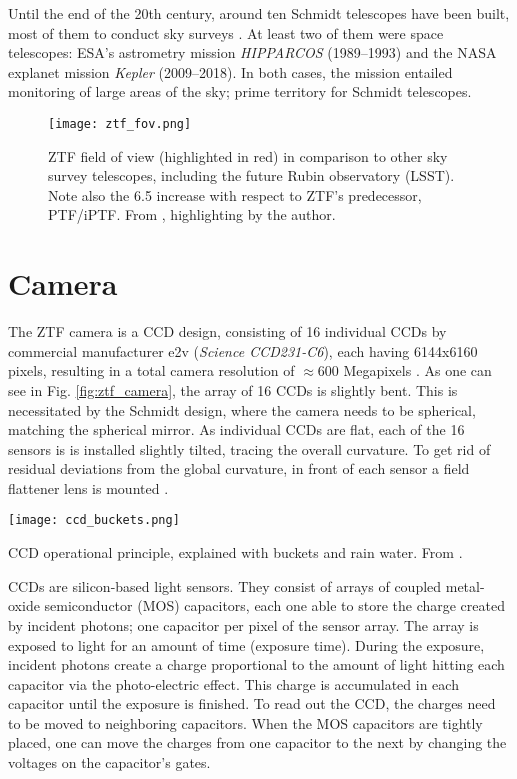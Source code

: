Until the end of the 20th century, around ten Schmidt telescopes have been built, most of them to conduct sky surveys . At least two of them were space telescopes: ESA's astrometry mission \textit{HIPPARCOS}  (1989--1993) and the NASA explanet mission \textit{Kepler}  (2009--2018). In both cases, the mission entailed monitoring of large areas of the sky; prime territory for Schmidt telescopes.

\begin{figure}[]
    \texttt{[image: ztf\_fov.png]}
    \caption[ZTF Field of View]{ZTF field of view (highlighted in red) in comparison to other sky survey telescopes, including the future Rubin observatory (LSST). Note also the 6.5 increase with respect to ZTF's predecessor, PTF/iPTF. From \cite{Laher2018}, highlighting by the author.}
\end{figure}



\section{Camera}
The ZTF camera is a CCD design, consisting of 16 individual CCDs by commercial manufacturer e2v (\textit{Science CCD231-C6}), each having 6144x6160 pixels, resulting in a total camera resolution of $\approx 600$ Megapixels . As one can see in Fig. \ref{fig:ztf_camera}, the array of 16 CCDs is slightly bent. This is necessitated by the Schmidt design, where the camera needs to be spherical, matching the spherical mirror. As individual CCDs are flat, each of the 16 sensors is is installed slightly tilted, tracing the overall curvature. To get rid of residual deviations from the global curvature, in front of each sensor a field flattener lens is mounted .

\begin{marginfigure}
    \texttt{[image: ccd\_buckets.png]}
    \caption[CCD operational principle]{CCD operational principle, explained with buckets and rain water. From \cite{Janesick1987}.}
\end{marginfigure}

CCDs are silicon-based light sensors. They consist of arrays of coupled metal-oxide semiconductor (MOS) capacitors, each one able to store the charge created by incident photons; one capacitor per pixel of the sensor array. The array is exposed to light for an amount of time (exposure time). During the exposure, incident photons create a charge proportional to the amount of light hitting each capacitor via the photo-electric effect. This charge is accumulated in each capacitor until the exposure is finished. To read out the CCD, the charges need to be moved to neighboring capacitors. When the MOS capacitors are tightly placed, one can move the charges from one capacitor to the next by changing the voltages on the capacitor's gates.

